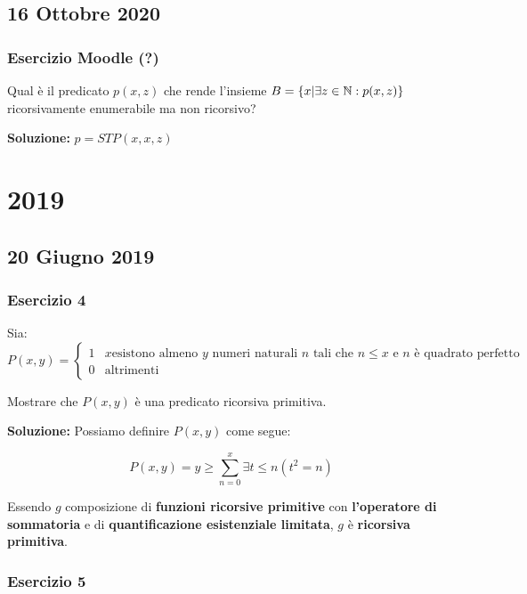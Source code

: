\subsection{16 Ottobre 2020}

\subsubsection{Esercizio Moodle (?)}

Qual è il predicato \(p(x,z)\) che rende l'insieme \(B=\displaystyle{\left\{{x \vert \exists z \in \mathbb{N}: p(x,z)}\right\}}\) ricorsivamente enumerabile ma non ricorsivo?

\textbf{Soluzione: } \(p=STP(x,x,z)\)

\section{2019}

\subsection{20 Giugno 2019}

\subsubsection{Esercizio 4}

Sia:
\begin{equation}
  P(x,y)=\begin{cases}
    1 & x \text{esistono almeno } y \text{ numeri naturali } n \text{ tali che } n\leq x \text{ e } n \text { è quadrato perfetto}\\
    0 & \text{altrimenti}
  \end{cases}
\end{equation}

Mostrare che \(P(x,y)\) è una predicato ricorsiva primitiva.

\textbf{Soluzione:} Possiamo definire \(P(x,y)\) come segue:

\begin{equation}
  P(x,y) = y \geq \sum_{n=0}^{x} \exists t \leq n (t^2=n)
\end{equation}

Essendo \(g\) composizione di \textbf{funzioni ricorsive primitive} con \textbf{l'operatore di sommatoria} e di \textbf{quantificazione esistenziale limitata}, \(g\) è \textbf{ricorsiva primitiva}.

\subsubsection{Esercizio 5}

